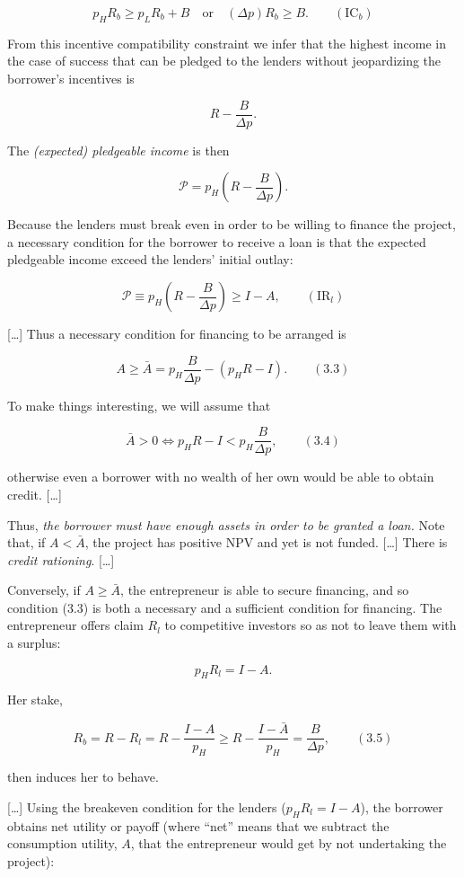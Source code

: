 \documentclass[11pt,a4paper]{article}
\begin{document}
\[p_H R_b \geqslant p_L R_b + B \quad \text{or} \quad (\Delta p) R_b \geqslant B. \qquad (\text{IC}_b)\]

From this incentive compatibility constraint we infer that the highest income in the case of success
that can be pledged to the lenders without jeopardizing the borrower's incentives is

\[R - \frac{B}{\Delta p}.\]

The \emph{(expected) pledgeable income} is then

\[\mathcal{P} = p_H\left(R - \frac{B}{\Delta p}\right).\]

Because the lenders must break even in order to be willing to finance the project, a necessary
condition for the borrower to receive a loan is that the expected pledgeable income exceed the
lenders' initial outlay:

\[\mathcal{P} \equiv p_H\left(R - \frac{B}{\Delta p}\right) \geqslant I - A, \qquad (\text{IR}_l)\]

{[}\ldots{]} Thus a necessary condition for financing to be arranged is

\[A \geqslant \bar A = p_H \frac{B}{\Delta p} - (p_H R - I). \qquad (3.3)\]

To make things interesting, we will assume that

\[\bar A > 0 \iff p_H R - I < p_H \frac{B}{\Delta p}, \qquad (3.4)\]

otherwise even a borrower with no wealth of her own would be able to obtain credit. {[}\ldots{]}

Thus, \emph{the borrower must have enough assets in order to be granted a loan.} Note that, if
\(A < \bar A\), the project has positive NPV and yet is not funded. {[}\ldots{]} There is
\emph{credit rationing}. {[}\ldots{]}

Conversely, if \(A \geqslant \bar A\), the entrepreneur is able to secure financing, and so
condition (3.3) is both a necessary and a sufficient condition for financing. The entrepreneur
offers claim \(R_l\) to competitive investors so as not to leave them with a surplus:

\[p_H R_l = I - A.\]

Her stake,

\[R_b = R - R_l = R - \frac{I - A}{p_H} \geqslant R - \frac{I - \bar A}{p_H} = \frac{B}{\Delta p}, \qquad (3.5)\]

then induces her to behave.

{[}\ldots{]} Using the breakeven condition for the lenders (\(p_H R_l = I - A\)), the borrower
obtains net utility or payoff (where ``net'' means that we subtract the consumption utility, \(A\),
that the entrepreneur would get by not undertaking the project):
\end{document}
